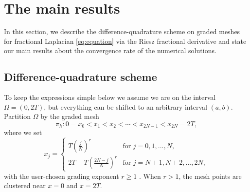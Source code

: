 \documentclass{amsart}
\theoremstyle{definition}
\theoremstyle{remark}
\numberwithin{equation}{section}
\begin{document}
	
	









\section{The main results}


In this section, we describe  the difference-quadrature scheme   on graded meshes  for fractional Laplacian \eqref{eq:equation}
via the  Riesz fractional derivative
and state our main results about the convergence rate of the numerical solutions.


\subsection{Difference-quadrature scheme}
\label{sec:numformat}

To keep the expressions simple below we assume we are on the interval $\Omega = (0, 2T)$, but everything can be shifted to an arbitrary interval $(a, b)$.
Partition $\Omega$ by the graded mesh
\begin{equation*}
    \pi_h : 0 = x_0 < x_1 < x_2 < \cdots < x_{2N-1} < x_{2N} = 2T ,
\end{equation*}
where we set
\begin{equation} \label{def:xj}
  x_j = \begin{cases}
    T \left(\frac{j}{N}\right)^r      & \text{for  } j=0, 1, ... , N,  \\
    2T - T \left(\frac{2N-j}{N}\right)^r  & \text{for  } j= N+1, N+2, ..., 2N,
  \end{cases}
\end{equation}
with the user-chosen grading exponent $r\ge 1$ .
When $r > 1$, the mesh points are clustered near $x = 0$ and $x = 2T$.
\end{document}
